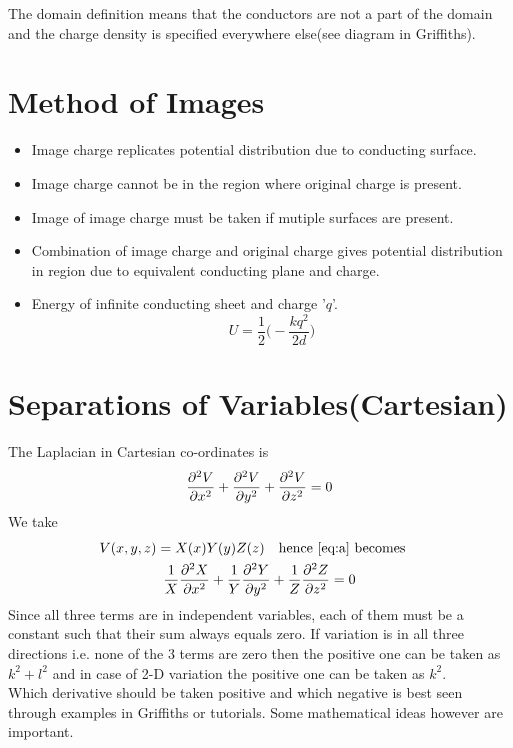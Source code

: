 \documentclass[12pt, oneside]{book}
\begin{document}
The domain definition means that the conductors are not a part of the domain and the charge density is specified everywhere else(see diagram in Griffiths). 

\section{Method of Images}
\begin{itemize}
	\item Image charge replicates potential distribution due to conducting surface.
	\item Image charge cannot be in the region where original charge is present.
	\item Image of image charge must be taken if mutiple surfaces are present.
	\item Combination of image charge and original charge gives potential distribution in region due to equivalent conducting plane and charge.
	\item Energy of infinite conducting sheet and charge '$q$'. 
	\begin{equation}
		U=\frac{1}{2}\bigg(-\dfrac{kq^2}{2d}\bigg)
	\end{equation}
	 
\end{itemize}

\section{Separations of Variables(Cartesian)}
 The Laplacian in Cartesian co-ordinates is
\begin{equation}
	\pdv[2]{V}{x}+\pdv[2]{V}{y}+\pdv[2]{V}{z}=0 \label{eq:a}
\end{equation}
We take 
\begin{gather}
	V(x,y,z)=X(x)Y(y)Z(z) \qq{hence \eqref{eq:a} becomes} \\
	\frac{1}{X}\pdv[2]{X}{x}+\frac{1}{Y}\pdv[2]{Y}{y}+\frac{1}{Z}\pdv[2]{Z}{z}=0
\end{gather}
Since all three terms are in independent variables, each of them must be a constant such that their sum always equals zero. If variation is in all three directions i.e. none of the 3 terms are zero then the positive one can be taken as $k^2+l^2$ and in case of 2-D variation the positive one can be taken as $k^2$. \\

Which derivative should be taken positive and which negative is best seen through examples in Griffiths or tutorials. Some mathematical ideas however are important. 
\end{document}
